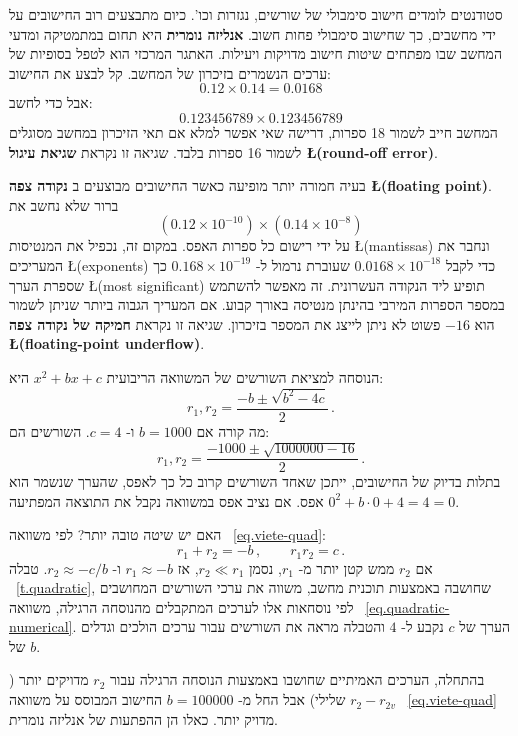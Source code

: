 סטודנטים לומדים חישוב סימבולי של שורשים, נגזרות וכו'. כיום מתבצעים רוב החישובים על ידי מחשבים, כך שחישוב סימבולי פחות חשוב. 
\textbf{אנליזה נומרית}
היא תחום במתמטיקה ומדעי המחשב שבו מפתחים שיטות חישוב מדויקות ויעילות. האתגר המרכזי הוא לטפל בסופיות של ערכים הנשמרים בזיכרון של המחשב. קל לבצע את החישוב:
\[0.12\times 0.14=0.0168\]
אבל כדי לחשב:
\[0.123456789\times 0.123456789\]
המחשב חייב לשמור 18 ספרות, דרישה שאי אפשר למלא אם תאי הזיכרון במחשב מסוגלים לשמור 16 ספרות בלבד. שגיאה זו נקראת 
\textbf{שגיאת עיגול \L{(round-off error)}}.

בעיה חמורה יותר מופיעה כאשר החישובים מבוצעים ב%
\textbf{נקודה צפה \L{(floating point)}}.
ברור שלא נחשב את
\[(0.12\times 10^{-10})\times (0.14\times 10^{-8})\]
על ידי רישום כל ספרות האפס. במקום זה, נכפיל את המנטיסות
\L{(mantissas)}
ונחבר את המעריכים
\L{(exponents)}
כדי לקבל
$0.0168\times 10^{-18}$
שעוברת נרמול ל-%
$0.168\times 10^{-19}$
כך שספרת הערך
\L{(most significant)}
תופיע ליד הנקודה העשרונית. זה מאפשר להשתמש במספר הספרות המירבי בהינתן מנטיסה באורך קבוע. אם המעריך הגבוה ביותר שניתן לשמור הוא 
$-16$
פשוט לא ניתן לייצג את המספר בזיכרון. שגיאה זו נקראת 
\textbf{חמיקה של נקודה צפה \L{(floating-point underflow)}}.

הנוסחה למציאת השורשים של המשוואה הריבועית
$x^2+bx+c$ 
היא:
\begin{equation}
r_1, r_2 = \frac{-b\pm\sqrt{b^2-4c}}{2}\,.\label{eq.quadratic-numerical}
\end{equation}
מה קורה אם
$b=1000$
ו-%
$c=4$.
השורשים הם:
\[
r_1, r_2 = \frac{-1000\pm\sqrt{1000000-16}}{2}\,.
\]
בתלות בדיוק של החישובים, ייתכן שאחד השורשים קרוב כל כך לאפס, שהערך שנשמר הוא אפס. אם נציב אפס במשוואה נקבל את התוצאה המפתיעה
$0^2+b\cdot 0 +4= 4= 0$.

האם יש שיטה טובה יותר? לפי משוואה%
~\ref{eq.viete-quad}:
\[
r_1+r_2 = -b\,,\quad\quad r_1r_2=c\,.
\]
אם
$r_2$
ממש קטן יותר מ-%
$r_1$,
נסמן
$r_2\ll r_1$,
אז
$r_1\approx -b$
ו-%
$r_2\approx -c/b$.
טבלה%
~\ref{t.quadratic},
שחושבה באמצעות תוכנית מחשב, משווה את ערכי השורשים המחושבים לפי נוסחאות אלו לערכים המתקבלים מהנוסחה הרגילה, משוואה%
~\ref{eq.quadratic-numerical}.
הערך של
$c$
נקבע ל-%
$4$
והטבלה מראה את השורשים עבור ערכים הולכים וגדלים של
$b$.

בהתחלה, הערכים האמיתיים שחושבו באמצעות הנוסחה הרגילה עבור
$r_2$
מדויקים יותר
($r_2-r_{2v}$ שלילי)
אבל החל מ-%
$b=100000$
החישוב המבוסס על משוואה%
~\ref{eq.viete-quad}
מדויק יותר. כאלו הן ההפתעות של אנליזה נומרית.


